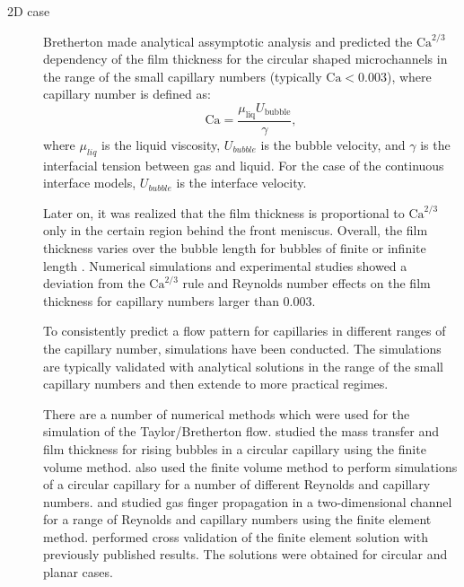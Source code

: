 \documentclass{CFD2011}
\newcommand{\Ca}{\mathrm{Ca}}
\begin{document}
\begin{description}
\item[2D case]
Bretherton made analytical assymptotic analysis and predicted the $\Ca^{2/3}$ dependency of the film
thickness for the circular shaped microchannels in the range of the small capillary numbers
(typically $\Ca<0.003$), where capillary number is defined as:
\begin{equation}
\label{capillary:number:definition}
\Ca=\frac{\mu_{\mathrm{liq}} U_\mathrm{bubble}}{\gamma},
\end{equation}
where $\mu_{liq}$ is the liquid viscosity, $U_{bubble}$ is the bubble velocity, and
$\gamma$ is the interfacial tension between gas and liquid. For the case of the continuous
interface models,  $U_{bubble}$ is the interface velocity.

Later on, it was realized
\cite{wong-films,wong-pressure} that the film thickness
is proportional to $\Ca^{2/3}$ only in the certain region behind the front meniscus. Overall, the
film thickness
varies over the bubble length for bubbles of finite or infinite length
\cite{heil-threedim}. Numerical
simulations \cite{giavedoni-numerical} and experimental studies
\cite{kreutzer-pressure-drop} showed a deviation from the $\Ca^{2/3}$ rule and Reynolds number 
effects on the film thickness for capillary numbers larger than $0.003$.

To consistently  predict a flow pattern for capillaries in
different ranges of the capillary number, simulations have been conducted. The simulations are
typically validated with analytical solutions in the range of the small capillary numbers
 and then extende to more practical regimes.

There are a number of numerical methods which
were used for the simulation of the Taylor/Bretherton flow.
\citet{vanbaten-circular} studied the mass transfer and film
thickness for rising bubbles in a circular capillary using the finite volume method.
\citet{kreutzer-pressure-drop} also used the finite volume method to perform
simulations of a circular capillary for a number of different
Reynolds and capillary numbers. 
\citet{heil-bretherton} and \citet{ingham-plates} studied gas finger propagation in
a two-dimensional channel for a range of Reynolds and capillary
numbers using the finite element method. \citet{giavedoni-numerical} performed cross validation of
the
finite element solution with previously published results.
The solutions were obtained for circular and planar cases. 


\end{description}
\end{document}
